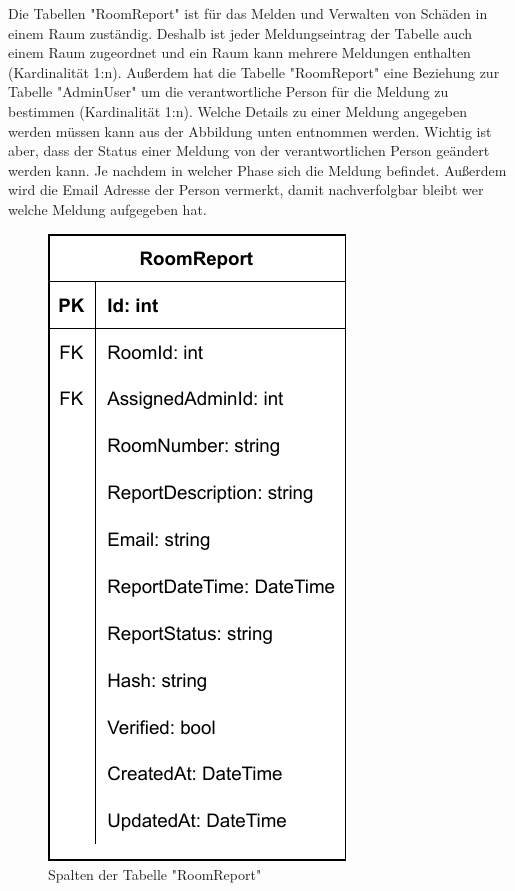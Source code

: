 
Die Tabellen "RoomReport" ist für das Melden und Verwalten von Schäden in einem Raum zuständig. Deshalb ist jeder Meldungseintrag der Tabelle auch einem Raum zugeordnet und ein Raum kann mehrere Meldungen enthalten (Kardinalität 1:n). Außerdem hat die Tabelle "RoomReport" eine Beziehung zur Tabelle "AdminUser" um die verantwortliche Person für die Meldung zu bestimmen (Kardinalität 1:n). Welche Details zu einer Meldung angegeben werden müssen kann aus der Abbildung unten entnommen werden. Wichtig ist aber, dass der Status einer Meldung von der verantwortlichen Person geändert werden kann. Je nachdem in welcher Phase sich die Meldung befindet. Außerdem wird die Email Adresse der Person vermerkt, damit nachverfolgbar bleibt wer welche Meldung aufgegeben hat.

\begin{figure}[H]
    \centering
    \includegraphics{media/MariaDB/RoomReport.svg.pdf}
    \caption{Spalten der Tabelle "RoomReport"}
\end{figure}

